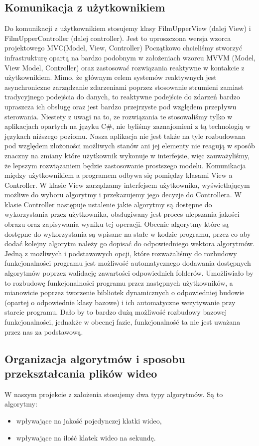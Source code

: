 \documentclass[twoside]{projektInzynierskiMS}
\begin{document}
\subsection{Komunikacja z użytkownikiem}
Do komunikacji z użytkownikiem stosujemy klasy FilmUpperView (dalej View) i FilmUpperController (dalej controller). Jest to uproszczona wersja wzorca projektowego MVC(Model, View, Controller) Początkowo chcieliśmy  stworzyć infrastrukturę opartą na bardzo podobnym w założeniach wzorcu MVVM (Model, View Model, Controller) oraz zastosować rozwiązania reaktywne w kontakcie z użytkownikiem. Mimo, że głównym celem systemów reaktywnych jest asynchroniczne zarządzanie zdarzeniami poprzez stosowanie strumieni zamiast tradycyjnego podejścia do danych, to reaktywne podejście do zdarzeń bardzo upraszcza ich obsługę oraz jest bardzo przejrzyste pod względem przepływu sterowania. Niestety z uwagi na to, ze rozwiązania te stosowaliśmy tylko w aplikacjach opartych na języku C\#, nie byliśmy zaznajomieni z tą technologią w językach niższego poziomu. Nasza aplikacja nie jest także na tyle rozbudowana pod względem złożoności możliwych stanów ani jej elementy nie reagują w sposób znaczny na zmiany które użytkownik wykonuje w interfejsie, więc zauważyliśmy, że lepszym rozwiązaniem będzie zastosowanie prostszego modelu. Komunikacja między użytkownikiem a programem odbywa się pomiędzy klasami View a Controller. W klasie View zarządzamy interfejsem użytkownika, wyświetlającym możliwe do wyboru algorytmy i przekazujemy jego decyzje do Controllera. W klasie Controller następuje ustalenie jakie algorytmy są dostępne do wykorzystania przez użytkownika, obsługiwany jest proces ulepszania jakości obrazu oraz zapisywania wyniku tej operacji. Obecnie algorytmy które są dostępne do wykorzystania są wpisane na stałe w kodzie programu, przez co aby dodać kolejny algorytm należy go dopisać do odpowiedniego wektora algorytmów. Jedną z możliwych i podstawowych opcji, które rozważaliśmy do rozbudowy funkcjonalności programu jest możliwość automatycznego dodawania dostępnych algorytmów poprzez walidację zawartości odpowiednich folderów. Umożliwiało by to rozbudowę funkcjonalności programu przez następnych użytkowników, a mianowicie poprzez tworzenie bibliotek dynamicznych o odpowiedniej budowie (opartej o odpowiednie klasy bazowe) i ich automatyczne wczytywanie przy starcie programu. Dało by to bardzo dużą możliwość rozbudowy bazowej funkcjonalności, jednakże w obecnej fazie, funkcjonalność ta nie jest uważana przez nas za podstawową.

\subsection{Organizacja algorytmów i sposobu przekształcania plików wideo}
W naszym projekcie z założenia stosujemy dwa typy algorytmów. Są to algorytmy:
\begin{itemize}
\item wpływające na jakość pojedynczej klatki wideo,
\item wpływające na ilość klatek wideo na sekundę.
\end{itemize}
\end{document}

